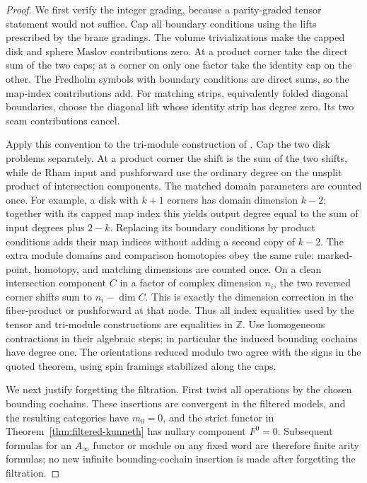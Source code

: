 \documentclass[11pt]{article}
\numberwithin{equation}{section}
\theoremstyle{definition}
\theoremstyle{remark}
\begin{document}
\begin{proof}
We first verify the integer grading, because a parity-graded
tensor statement would not suffice.  Cap all boundary conditions
using the lifts prescribed by the brane gradings.  The volume
trivializations make the capped disk and sphere Maslov
contributions zero.  At a product corner take the direct sum
of the two caps; at a corner on only one factor take the
identity cap on the other.  The Fredholm symbols with boundary
conditions are direct sums, so the map-index contributions add.
For matching strips, equivalently folded diagonal boundaries,
choose the diagonal lift whose identity strip has degree zero.
Its two seam contributions cancel.

Apply this convention to the tri-module construction of
\cite[Sections~5 and~16]{Floer:Fukaya}.  Cap the two disk
problems separately.  At a product corner the shift is the sum
of the two shifts, while de Rham input and pushforward use the
ordinary degree on the unsplit product of intersection
components.  The matched domain parameters are counted once.
For example, a disk with $k+1$ corners has domain dimension
$k-2$; together with its capped map index this yields output
degree equal to the sum of input degrees plus $2-k$.
Replacing its boundary conditions by product conditions adds
their map indices without adding a second copy of $k-2$.
The extra module domains and comparison homotopies obey the
same rule: marked-point, homotopy, and matching dimensions
are counted once.  On a clean intersection component $C$
in a factor of complex dimension $n_i$, the two reversed
corner shifts sum to $n_i-\dim C$.  This is exactly the
dimension correction in the fiber-product or pushforward
at that node.  Thus all index equalities used by the tensor
and tri-module constructions are equalities in $\mathbb Z$.
Use homogeneous contractions in their algebraic steps;
in particular the induced bounding cochains have degree one.
The orientations reduced modulo two agree with the signs in
the quoted theorem, using spin framings stabilized along the
caps.

We next justify forgetting the filtration.  First twist all
operations by the chosen bounding cochains.  These insertions
are convergent in the filtered models, and the resulting
categories have $m_0=0$, and the strict functor in
Theorem~\ref{thm:filtered-kunneth} has nullary component $F^0=0$.
Subsequent formulas for an
$A_\infty$ functor or module on any fixed word are therefore
finite arity formulas; no new infinite bounding-cochain
insertion is made after forgetting the filtration.


\end{proof}
\end{document}
